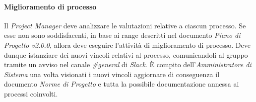 	\paragraph{Miglioramento di processo} \Spazio
	\label{sec:miglioramentoProcesso}
	Il \emph{Project Manager} deve analizzare le valutazioni relative a ciascun processo. Se esse non sono soddisfacenti, in base ai range descritti nel documento \emph{Piano di Progetto v2.0.0}, allora deve eseguire l'attività di miglioramento di processo. Deve dunque istanziare dei nuovi vincoli relativi al processo, comunicandoli al gruppo tramite un avviso nel canale \emph{\#general} di \emph{Slack}. È compito dell'\emph{Amministratore di Sistema} una volta visionati i nuovi vincoli aggiornare di conseguenza il documento \emph{Norme di Progetto} e tutta la possibile documentazione annessa ai processi coinvolti. 
